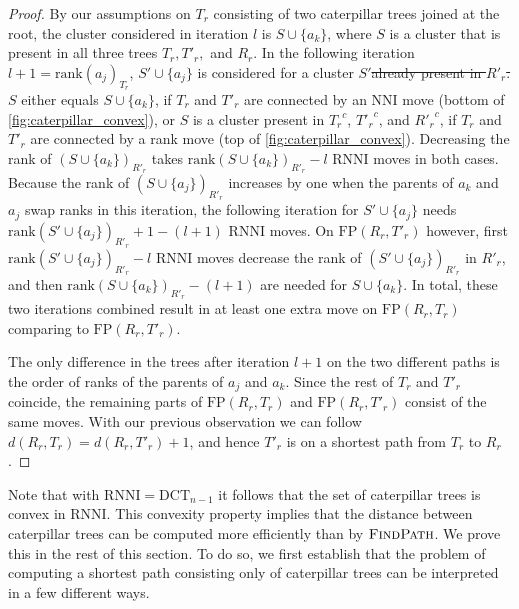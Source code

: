 \documentclass[11pt]{amsart}
\newcommand{\rnni}{\mathrm{RNNI}}
\newcommand{\findpath}{\textsc{FindPath}}
\newcommand{\rank}{\mathrm{rank}}
\newcommand{\nni}{\mathrm{NNI}}
\newcommand{\fp}{\mathrm{FP}}
\newcommand{\dct}{\mathrm{DCT}}
\providecommand{\DIFaddtex}[1]{{\protect\color{blue}\uwave{#1}}} %
\providecommand{\DIFdeltex}[1]{{\protect\color{red}\sout{#1}}}                      %
\providecommand{\DIFaddbegin}{} %
\providecommand{\DIFaddend}{} %
\providecommand{\DIFdelbegin}{} %
\providecommand{\DIFdelend}{} %
\providecommand{\DIFadd}[1]{\texorpdfstring{\DIFaddtex{#1}}{#1}} %
\providecommand{\DIFdel}[1]{\texorpdfstring{\DIFdeltex{#1}}{}} %
\newcommand{\DIFscaledelfig}{0.5}
\newlength{\DIFdelgraphicswidth} %
\newlength{\DIFdelgraphicsheight} %
\newcommand{\DIFaddincludegraphics}[2][]{{\color{blue}\fbox{\DIFOincludegraphics[#1]{#2}}}} %
\newcommand{\DIFdelincludegraphics}[2][]{%
\sbox{\DIFdelgraphicsbox}{\DIFOincludegraphics[#1]{#2}}%
\settoboxwidth{\DIFdelgraphicswidth}{\DIFdelgraphicsbox} %
\settoboxtotalheight{\DIFdelgraphicsheight}{\DIFdelgraphicsbox} %
\scalebox{\DIFscaledelfig}{%
\parbox[b]{\DIFdelgraphicswidth}{\usebox{\DIFdelgraphicsbox}\\[-\baselineskip] \rule{\DIFdelgraphicswidth}{0em}}\llap{\resizebox{\DIFdelgraphicswidth}{\DIFdelgraphicsheight}{%
\setlength{\unitlength}{\DIFdelgraphicswidth}%
\begin{picture}(1,1)%
\thicklines\linethickness{2pt} %
{\color[rgb]{1,0,0}\put(0,0){\framebox(1,1){}}}%
{\color[rgb]{1,0,0}\put(0,0){\line( 1,1){1}}}%
{\color[rgb]{1,0,0}\put(0,1){\line(1,-1){1}}}%
\end{picture}%
}\hspace*{3pt}}} %
} %
\DeclareRobustCommand{\DIFaddbegin}{\DIFOaddbegin \let\includegraphics\DIFaddincludegraphics} %
\DeclareRobustCommand{\DIFaddend}{\DIFOaddend \let\includegraphics\DIFOincludegraphics} %
\DeclareRobustCommand{\DIFdelbegin}{\DIFOdelbegin \let\includegraphics\DIFdelincludegraphics} %
\DeclareRobustCommand{\DIFdelend}{\DIFOaddend \let\includegraphics\DIFOincludegraphics} %
\begin{document}
\begin{proof}
	By our assumptions on $T_r$ consisting of two caterpillar trees joined at the root, the cluster considered in iteration $l$ is $S \cup \{a_k\}$, where $S$ is a cluster that is present in all three trees $T_r, T'_r,$ and $R_r$.
	In the following iteration $l+1 = \rank(a_j)_{T_r}$, $S' \cup \{a_j\}$ is considered for a cluster $S'$\DIFdelbegin \DIFdel{already present in $R'_r$.
	$S$ }\DIFdelend \DIFaddbegin \DIFadd{.
	$S'$ }\DIFaddend either equals $S \cup \{a_k\}$, if $T_r$ and $T'_r$ are connected by an $\nni$ move (bottom of \autoref{fig:caterpillar_convex}), or \DIFdelbegin \DIFdel{$S$ }\DIFdelend \DIFaddbegin \DIFadd{$S'$ }\DIFaddend is a cluster present in ${T_r}^c$, ${T'_r}^c$, and ${R'_r}^c$, if $T_r$ and $T'_r$ are connected by a rank move (top of \autoref{fig:caterpillar_convex}).
	Decreasing the rank of $(S \cup \{a_k\})_{R'_r}$ takes $\rank(S \cup \{a_k\})_{R'_r} - l$ $\rnni$ moves in both cases.
	Because the rank of $(S \cup \{a_j\})_{R'_r}$ increases by one when the parents of $a_k$ and $a_j$ swap ranks in this iteration, the following iteration for $S' \cup \{a_j\}$ needs $\rank(S' \cup \{a_j\})_{R'_r} + 1 - (l+1)$ $\rnni$ moves.
	On $\fp(R_r,T'_r)$ however, first $\rank(S' \cup \{a_j\})_{R'_r} - l$ $\rnni$ moves decrease the rank of $(S' \cup \{a_j\})_{R'_r}$ in $R'_r$, and then $\rank(S \cup \{a_k\})_{R'_r} - (l+1)$ are needed for $S \cup \{a_k\}$.
	In total, these two iterations combined result in at least one extra move on $\fp(R_r, T_r)$ comparing to $\fp(R_r, T'_r)$.

	The only difference in the trees after iteration $l+1$ on the two different paths is the order of ranks of the parents of $a_j$ and $a_k$.
	Since the rest of $T_r$ and $T'_r$ coincide, the remaining parts of $\fp(R_r, T_r)$ and $\fp(R_r, T'_r)$ consist of the same moves.
	With our previous observation we can follow \DIFdelbegin \DIFdel{$d(R_r,T_r) = d(R_r,T'_r) + 1$}\DIFdelend \DIFaddbegin \DIFadd{$d_{\rnni}(R_r,T_r) = d_{\rnni}(R_r,T'_r) + 1$}\DIFaddend , and hence $T'_r$ is on a shortest path from $T_r$ to $R_r$.
\end{proof}

Note that with $\rnni = \dct_{n-1}$ it follows that the set of caterpillar trees is convex in $\rnni$.
This convexity property implies that the distance between caterpillar trees can be computed more efficiently than by $\findpath$.
We prove this in the rest of this section.
To do so, we first establish that the problem of computing a shortest path consisting only of caterpillar trees can be interpreted in a few different ways.
\end{document}
